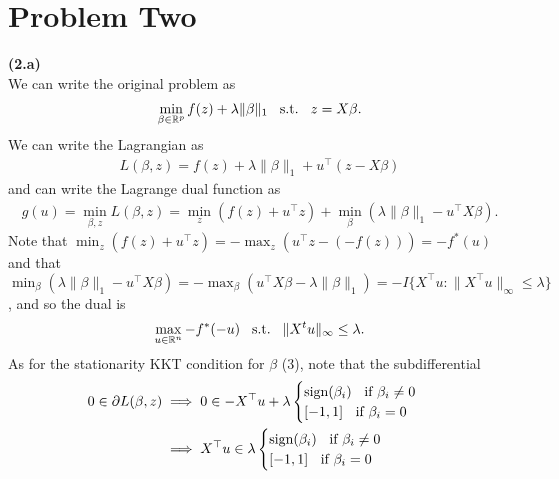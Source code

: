 

\section*{Problem Two}

\textbf{(2.a)}\\
We can write the original problem as
\begin{align*}
    \min_{\beta \in \mathbb{R}^p} f(z) + \lambda \| \beta \|_1  
    \hspace{3mm} \text{s.t.} \hspace{3mm}
    z = X\beta.
\end{align*}
We can write the Lagrangian as 
\begin{align*}
    L(\beta,z) = f(z) + \lambda \| \beta \|_1 + u^\top (z - X\beta)
\end{align*}
and can write the Lagrange dual function as 
\begin{align*}
    g(u) = \min_{\beta,z} L(\beta,z) = \min_z \left( f(z) + u^\top z \right)
    +  \min_\beta \left( \lambda \| \beta \|_1 - u^\top X \beta \right).
\end{align*}
Note that $\min_z \left( f(z) + u^\top z \right)  =  - \max_z \left( u^\top z - (-f(z)) \right)
=  -f^*(u)$ and that $\min_\beta \left( \lambda \| \beta \|_1  - u^\top X \beta \right)
= - \max_\beta \left( u^\top X \beta - \lambda \| \beta \|_1 \right) = 
-I\{X^\top u : \|X^\top u \|_\infty \leq \lambda \}$, and so the dual is
\begin{align*}
    \max_{u \in \mathbb{R}^n} -f^*(-u) \hspace{3mm}\text{s.t.}\hspace{3mm} \|X^t u\|_\infty \leq \lambda.
\end{align*}
As for the stationarity KKT condition for $\beta$ (3), note that the subdifferential 
\begin{align*}
0 \in \partial L(\beta,z) 
&\implies 0 \in -X^\top u + \lambda
\begin{cases}
    \text{sign}(\beta_i) \hspace{2mm} \text{ if } \beta_i \neq 0 \\
    [-1,1] \hspace{2mm} \text{ if } \beta_i = 0
\end{cases} \\
&\implies X^\top u \in \lambda
\begin{cases}
    \text{sign}(\beta_i) \hspace{2mm} \text{ if } \beta_i \neq 0 \\
    [-1,1] \hspace{2mm} \text{ if } \beta_i = 0
\end{cases}
\end{align*}


